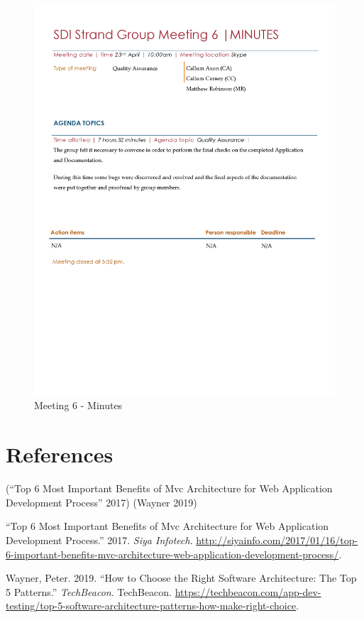 \documentclass[
  english,
  a4paper,
,tablecaptionabove
]{scrartcl}
\begin{document}
\begin{figure}
\centering
\includegraphics{images/meeting-minutes/meeting-6.png}
\caption{Meeting 6 - Minutes}
\end{figure}

\hypertarget{references}{%
\section{References}\label{references}}

(``Top 6 Most Important Benefits of Mvc Architecture for Web Application
Development Process'' 2017) (Wayner 2019)

\hypertarget{refs}{}
\leavevmode\hypertarget{ref-infotech_2017}{}%
``Top 6 Most Important Benefits of Mvc Architecture for Web Application
Development Process.'' 2017. \emph{Siya Infotech}.
\url{http://siyainfo.com/2017/01/16/top-6-important-benefits-mvc-architecture-web-application-development-process/}.

\leavevmode\hypertarget{ref-wayner_2019}{}%
Wayner, Peter. 2019. ``How to Choose the Right Software Architecture:
The Top 5 Patterns.'' \emph{TechBeacon}. TechBeacon.
\url{https://techbeacon.com/app-dev-testing/top-5-software-architecture-patterns-how-make-right-choice}.
\end{document}
